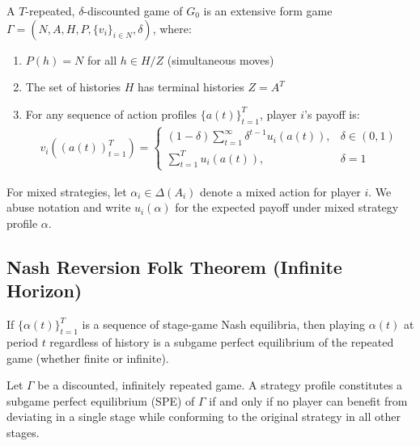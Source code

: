 \documentclass[11pt]{elegantbook_2}
\begin{document}
\begin{definition}
    A $T$-repeated, $\delta$-discounted game of $G_0$ is an extensive form game $\Gamma=\left(N,A,H,P,\{v_i\}_{i\in N},\delta\right)$, where:
    \begin{enumerate}
        \item $P(h)=N$ for all $h\in H/Z$ (simultaneous moves)
        \item The set of histories $H$ has terminal histories $Z=A^T$
        \item For any sequence of action profiles $\{a(t)\}_{t=1}^T$, player $i$'s payoff is:
        \begin{equation}
            \begin{aligned}
                v_i((a(t))_{t=1}^T)=\left\{\begin{matrix}
                    (1-\delta)\sum_{t=1}^\infty \delta^{t-1}u_i(a(t)),&\delta\in(0,1)\\
                    \sum_{t=1}^T u_i(a(t)),&\delta=1
                \end{matrix}\right.
            \end{aligned}
            \nonumber
        \end{equation}
    \end{enumerate}
\end{definition}

For mixed strategies, let $\alpha_i \in \Delta(A_i)$ denote a mixed action for player $i$. We abuse notation and write $u_i(\alpha)$ for the expected payoff under mixed strategy profile $\alpha$.

\subsection{Nash Reversion Folk Theorem (Infinite Horizon)}
\begin{proposition}
    If $\{\alpha(t)\}_{t=1}^T$ is a sequence of stage-game Nash equilibria, then playing $\alpha(t)$ at period $t$ regardless of history is a subgame perfect equilibrium of the repeated game (whether finite or infinite).
\end{proposition}

\begin{proposition}
    Let $\Gamma$ be a discounted, infinitely repeated game. A strategy profile constitutes a subgame perfect equilibrium (SPE) of $\Gamma$ if and only if no player can benefit from deviating in a single stage while conforming to the original strategy in all other stages.
\end{proposition}
\end{document}
